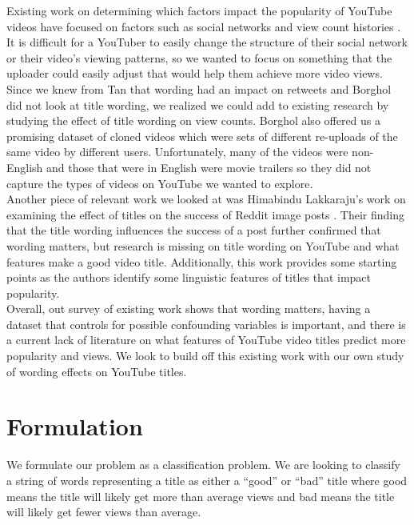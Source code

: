 \documentclass[a4paper,12pt]{article}
\begin{document}
Existing work on determining which factors impact the popularity of YouTube videos have focused on factors such as social networks and view count histories \cite{youmna+ardon+carlsson+eager+mahanti:12}. It is difficult for a YouTuber to easily change the structure of their social network or their video's viewing patterns, so we wanted to focus on something that the uploader could easily adjust that would help them achieve more video views. Since we knew from Tan that wording had an impact on retweets and Borghol did not look at title wording, we realized we could add to existing research by studying the effect of title wording on view counts. Borghol also offered us a promising dataset of cloned videos which were sets of different re-uploads of the same video by different users. Unfortunately, many of the videos were non-English and those that were in English were movie trailers so they did not capture the types of videos on YouTube we wanted to explore. \\

Another piece of relevant work we looked at was Himabindu Lakkaraju's work on examining the effect of titles on the success of Reddit image posts \cite{himabindu+mcauley+leskovec:13}. Their finding that the title wording influences the success of a post further confirmed that wording matters, but research is missing on title wording on YouTube and what features make a good video title. Additionally, this work provides some starting points as the authors identify some linguistic features of titles that impact popularity. \\

Overall, out survey of existing work shows that wording matters, having a dataset that controls for possible confounding variables is important, and there is a current lack of literature on what features of YouTube video titles predict more popularity and views. We look to build off this existing work with our own study of wording effects on YouTube titles.


\section{Formulation}
We formulate our problem as a classification problem. We are looking to classify a string of words representing a title as either a ``good'' or ``bad'' title where good means the title will likely get more than average views and bad means the title will likely get fewer views than average. \\
\end{document}
